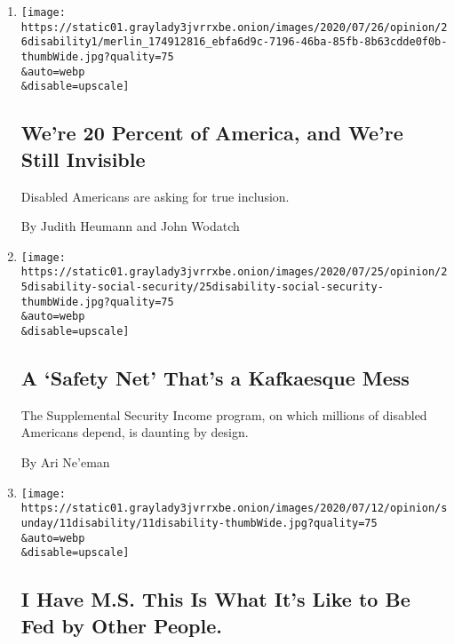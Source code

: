 \begin{enumerate}
\def\labelenumi{\arabic{enumi}.}
\item
  \href{/2020/07/26/opinion/Americans-with-disabilities-act.html}{}

  \texttt{[image: https://static01.graylady3jvrrxbe.onion/images/2020/07/26/opinion/26disability1/merlin\_174912816\_ebfa6d9c-7196-46ba-85fb-8b63cdde0f0b-thumbWide.jpg?quality=75\\\&auto=webp\\\&disable=upscale]}

  \hypertarget{were-20-percent-of-america-and-were-still-invisible}{%
  \subsection{We're 20 Percent of America, and We're Still
  Invisible}\label{were-20-percent-of-america-and-were-still-invisible}}

  Disabled Americans are asking for true inclusion.

  By Judith Heumann and John Wodatch
\item
  \href{/2020/07/25/opinion/a-safety-net-thats-a-kafkaesque-mess.html}{}

  \texttt{[image: https://static01.graylady3jvrrxbe.onion/images/2020/07/25/opinion/25disability-social-security/25disability-social-security-thumbWide.jpg?quality=75\\\&auto=webp\\\&disable=upscale]}

  \hypertarget{a-safety-net-thats-a-kafkaesque-mess}{%
  \subsection{A `Safety Net' That's a Kafkaesque
  Mess}\label{a-safety-net-thats-a-kafkaesque-mess}}

  The Supplemental Security Income program, on which millions of
  disabled Americans depend, is daunting by design.

  By Ari Ne'eman
\item
  \href{/2020/07/10/opinion/sunday/ms-disability-food-eating.html}{}

  \texttt{[image: https://static01.graylady3jvrrxbe.onion/images/2020/07/12/opinion/sunday/11disability/11disability-thumbWide.jpg?quality=75\\\&auto=webp\\\&disable=upscale]}

  \hypertarget{i-have-ms-this-is-what-its-like-to-be-fed-by-other-people}{%
  \subsection{I Have M.S. This Is What It's Like to Be Fed by Other
  People.}\label{i-have-ms-this-is-what-its-like-to-be-fed-by-other-people}}


\end{enumerate}
